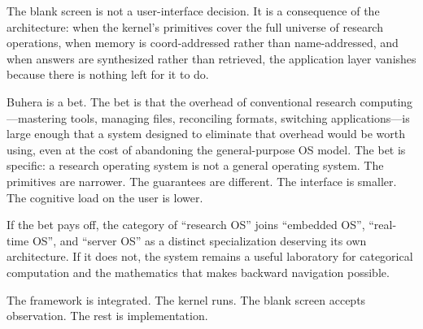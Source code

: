 \documentclass[11pt,twocolumn,a4paper]{article}
\begin{document}
The blank screen is not a user-interface decision. It is a consequence of the architecture: when the kernel's primitives cover the full universe of research operations, when memory is coord-addressed rather than name-addressed, and when answers are synthesized rather than retrieved, the application layer vanishes because there is nothing left for it to do.

Buhera is a bet. The bet is that the overhead of conventional research computing---mastering tools, managing files, reconciling formats, switching applications---is large enough that a system designed to eliminate that overhead would be worth using, even at the cost of abandoning the general-purpose OS model. The bet is specific: a research operating system is not a general operating system. The primitives are narrower. The guarantees are different. The interface is smaller. The cognitive load on the user is lower.

If the bet pays off, the category of ``research OS'' joins ``embedded OS'', ``real-time OS'', and ``server OS'' as a distinct specialization deserving its own architecture. If it does not, the system remains a useful laboratory for categorical computation and the mathematics that makes backward navigation possible.

The framework is integrated. The kernel runs. The blank screen accepts observation. The rest is implementation.



\end{document}
